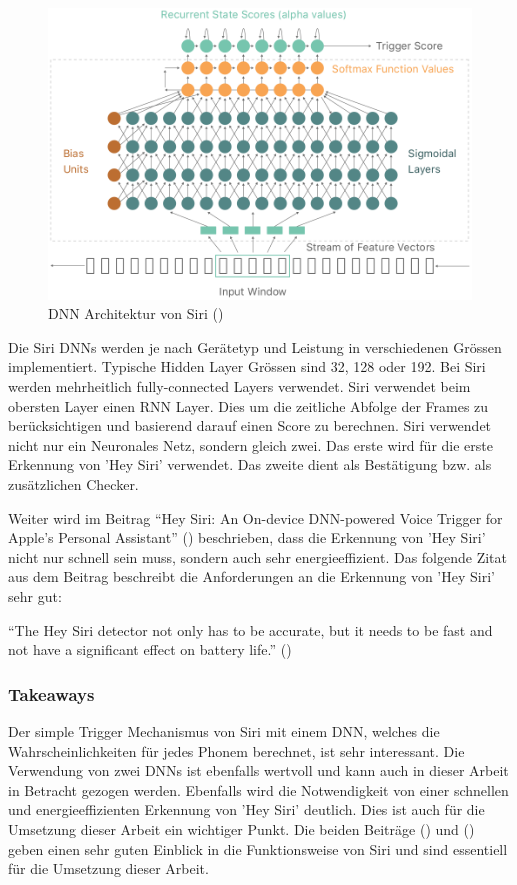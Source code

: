 \documentclass[11pt,a4paper]{article}
\begin{document}
\begin{figure}[h]
	\centering
	\includegraphics[width=0.75\linewidth]{img/siri_dnn.png}
	\caption{DNN Architektur von Siri (\cite{siri2017hey})}
	\label{fig:siri_dnn}
\end{figure}

\noindent
Die Siri DNNs werden je nach Gerätetyp und Leistung in verschiedenen Grössen implementiert.
Typische Hidden Layer Grössen sind 32, 128 oder 192. Bei Siri werden mehrheitlich fully-connected
Layers verwendet. Siri verwendet beim obersten Layer einen RNN Layer. Dies um die zeitliche
Abfolge der Frames zu berücksichtigen und basierend darauf einen Score zu berechnen. Siri verwendet
nicht nur ein Neuronales Netz, sondern gleich zwei. Das erste wird für die erste Erkennung von
'Hey Siri' verwendet. Das zweite dient als Bestätigung bzw. als zusätzlichen Checker.

\noindent \newline
Weiter wird im Beitrag ``Hey Siri: An On-device DNN-powered Voice Trigger for Apple’s Personal
Assistant'' (\cite{siri2017hey}) beschrieben, dass die Erkennung von 'Hey Siri' nicht nur schnell sein
muss, sondern auch sehr energieeffizient. Das folgende Zitat aus dem Beitrag beschreibt die
Anforderungen an die Erkennung von 'Hey Siri' sehr gut:

\begin{displayquote}
	``The Hey Siri detector not only has to be accurate, but it needs to be fast
	and not have a significant effect on battery life.''  (\cite{siri2017hey})
\end{displayquote}

\subsubsection{Takeaways}
Der simple Trigger Mechanismus von Siri mit einem DNN, welches die Wahrscheinlichkeiten für jedes Phonem berechnet, ist sehr
interessant. Die Verwendung von zwei DNNs ist ebenfalls wertvoll und kann auch in dieser Arbeit
in Betracht gezogen werden. Ebenfalls wird die Notwendigkeit von einer schnellen und
energieeffizienten Erkennung von 'Hey Siri' deutlich. Dies ist auch für die Umsetzung dieser Arbeit
ein wichtiger Punkt. Die beiden Beiträge (\cite{siri2017hey}) und (\cite{apple2023voice}) geben
einen sehr guten Einblick in die Funktionsweise von Siri und sind essentiell für die Umsetzung
dieser Arbeit.
\end{document}
